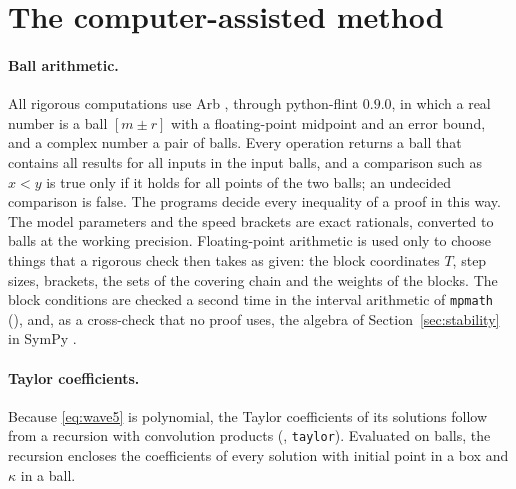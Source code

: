 \documentclass[11pt]{article}
\theoremstyle{definition}
\begin{document}
\section{The computer-assisted method}\label{sec:method}

\paragraph{Ball arithmetic.} All rigorous computations use Arb \cite{johansson2017}, through python-flint $0.9.0$, in which a real number is a ball $[m \pm r]$ with a floating-point midpoint and an error bound, and a complex number a pair of balls. Every operation returns a ball that contains all results for all inputs in the input balls, and a comparison such as $x < y$ is true only if it holds for all points of the two balls; an undecided comparison is false. The programs decide every inequality of a proof in this way. The model parameters and the speed brackets are exact rationals, converted to balls at the working precision. Floating-point arithmetic is used only to choose things that a rigorous check then takes as given: the block coordinates $T$, step sizes, brackets, the sets of the covering chain and the weights of the blocks. The block conditions are checked a second time in the interval arithmetic of \texttt{mpmath} \cite{mpmath} (), and, as a cross-check that no proof uses, the algebra of Section~\ref{sec:stability} in SymPy \cite{sympy}.

\paragraph{Taylor coefficients.} Because \eqref{eq:wave5} is polynomial, the Taylor coefficients of its solutions follow from a recursion with convolution products (, \texttt{taylor}). Evaluated on balls, the recursion encloses the coefficients of every solution with initial point in a box and $\kappa$ in a ball.
\end{document}
